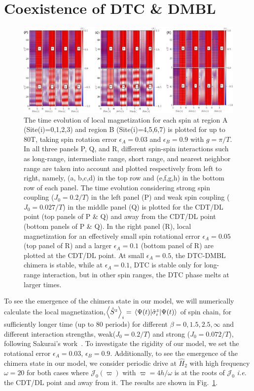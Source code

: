 \documentclass[%
nofootinbib,
reprint,
superscriptaddress,
amsmath,amssymb,showkeys,
aps,
prb,
]{revtex4-2}
\begin{document}
	
	\section{\label{sec:level3}Coexistence of DTC \& DMBL}
	
	
	\begin{figure}[t!]
		\centering
		\includegraphics[width=17.5cm]{sz_t_strongweakJ_ea_N_8.pdf}
		\caption{The time evolution of local magnetization for each spin at region A (Site(i)=0,1,2,3) and region B (Site(i)=4,5,6,7) is plotted for up to 80T, taking spin rotation error $\epsilon_A = 0.03$ and $\epsilon_B = 0.9$ with $g=\pi/T$.  In all three panels P, Q, and R, different spin-spin interactions such as long-range, intermediate range, short range, and nearest neighbor range are taken into account and plotted respectively from left to right, namely, (a, b,c,d) in the top row and (e,f,g,h) in the bottom row of each panel. The time evolution considering strong spin coupling ($J_0 = 0.2/T$) in the left panel (P) and weak spin coupling ($J_0 = 0.027/T$) in the middle panel (Q) is plotted  for the CDT/DL point (top panels of P \& Q) and away from the CDT/DL point (bottom panels of P \& Q). In the right panel (R), local magnetization for an effectively small spin rotational error $\epsilon_A = 0.05$ (top panel of R) and a larger $\epsilon_A = 0.1$ (bottom panel of R) are plotted at the CDT/DL point. At small $\epsilon_A=0.5$, the DTC-DMBL chimera is stable, while at $\epsilon_A=0.1$, DTC is stable only for long-range interaction, but in other spin ranges, the DTC phase melts at larger times.}
		\label{Fig:strong_weak_ea}
	\end{figure}
	
	To see the emergence of the chimera state in our model, we will numerically calculate the local magnetization,$\left\langle{\hat{S}^z}\right\rangle_i = \expval{\hat{\sigma}^z_i}{\Psi(t)}$ of spin chain, for sufficiently longer time (up to 80 periods) for different $\beta = 0,1.5,2.5,\infty$ and different interaction strengths, weak($J_0 = 0.2/T$) and strong ($J_0 = 0.072/T$), following Sakurai's work~\cite{sakurai_phys_nodate}. To investigate the rigidity of our model, we set the rotational error $\epsilon_A = 0.03$, $\epsilon_B = 0.9$. Additionally, to see the emergence of the chimera state in our model, we consider periodic drive at $\hat{H}_2$ with high frequency $\omega=20$ for both cases where $\mathcal{J}_0(\varpi)$ with $\varpi = 4h/\omega$ is at the roots of $\mathcal{J}_0$ \textit{i.e.} the CDT/DL point and away from it. The results are shown in Fig.~\ref{Fig:strong_weak_ea}. 
	
\end{document}
